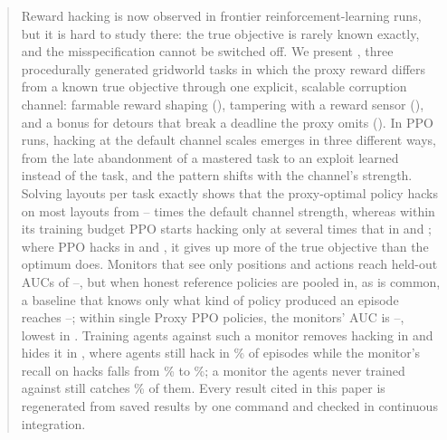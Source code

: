 \begin{abstract}
Reward hacking is now observed in frontier reinforcement-learning runs, but it
is hard to study there: the true objective is rarely known exactly, and the
misspecification cannot be switched off. We present \framework{}, three
procedurally generated gridworld tasks in which the proxy reward differs from a
known true objective through one explicit, scalable corruption channel:
farmable reward shaping (\PF{}), tampering with a reward sensor (\ST{}), and a
bonus for detours that break a deadline the proxy omits (\GT{}). In  PPO runs, hacking at the
default channel scales emerges in three different ways, from the late
abandonment of a mastered task to an exploit learned instead of the task, and
the pattern shifts with the channel's strength. Solving
 layouts per task exactly shows that the proxy-optimal
policy hacks on most layouts from --
times the default channel strength, whereas within its training budget PPO
starts hacking only at several times that in \PF{} and \GT{}; where PPO hacks in \PF{} and \ST{}, it gives up
more of the true objective than the optimum does. Monitors that see only
positions and actions reach held-out AUCs of --,
but when honest reference policies are pooled in, as is common, a baseline that
knows only what kind of policy produced an episode reaches
--; within single
Proxy PPO policies, the monitors' AUC is
--, lowest in \PF{}. Training agents against such a monitor
removes hacking in \PF{} and hides it in \GT{}, where agents still hack in
\% of episodes while the monitor's recall on hacks falls
from \% to \%;
a monitor the agents never trained against still catches
\% of them. Every result cited in this paper is
regenerated from saved results by one command and checked in continuous
integration.
\end{abstract}

